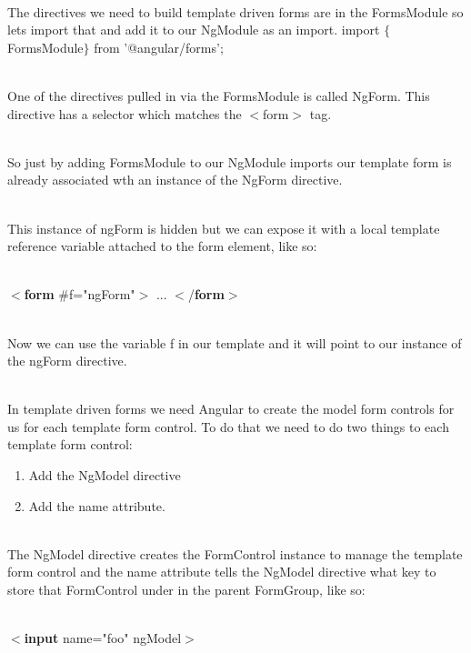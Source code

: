 \documentclass{article}
\begin{document}
\newpage
{}

\noindent \textbf{}

\noindent \\ The directives we need to build template driven forms are in the FormsModule so lets import that and add it to our NgModule as an import.  import $\mathrm{\{}$FormsModule$\mathrm{\}}$ from '@angular/forms'; 

\noindent \\ One of the directives pulled in via the FormsModule is called NgForm. This directive has a selector which matches the $\mathrm{<}$form$\mathrm{>}$ tag.

\noindent \\ So just by adding FormsModule to our NgModule imports our template form is already associated wth an instance of the NgForm directive.

\noindent \\ This instance of ngForm is hidden but we can expose it with a local template reference variable attached to the form element, like so: 

  

\noindent \\ $\mathrm{<}$\textbf{form} \#f="ngForm"$\mathrm{>}$ ... $\mathrm{<}$/\textbf{form}$\mathrm{>}$ 

\noindent \\ Now we can use the variable f in our template and it will point to our instance of the ngForm directive.

\noindent 

\noindent \\ In template driven forms we need Angular to create the model form controls for us for each template form control. To do that we need to do two things to each template form control:

\begin{enumerate}
	\item Add the NgModel directive 
	\item Add the name attribute.
\end{enumerate}

\noindent \\ The NgModel directive creates the FormControl instance to manage the template form control and the name attribute tells the NgModel directive what key to store that FormControl under in the parent FormGroup, like so: 

  

\noindent  \\  $\mathrm{<}$\textbf{input} name="foo" ngModel$\mathrm{>}$ 
\end{document}
